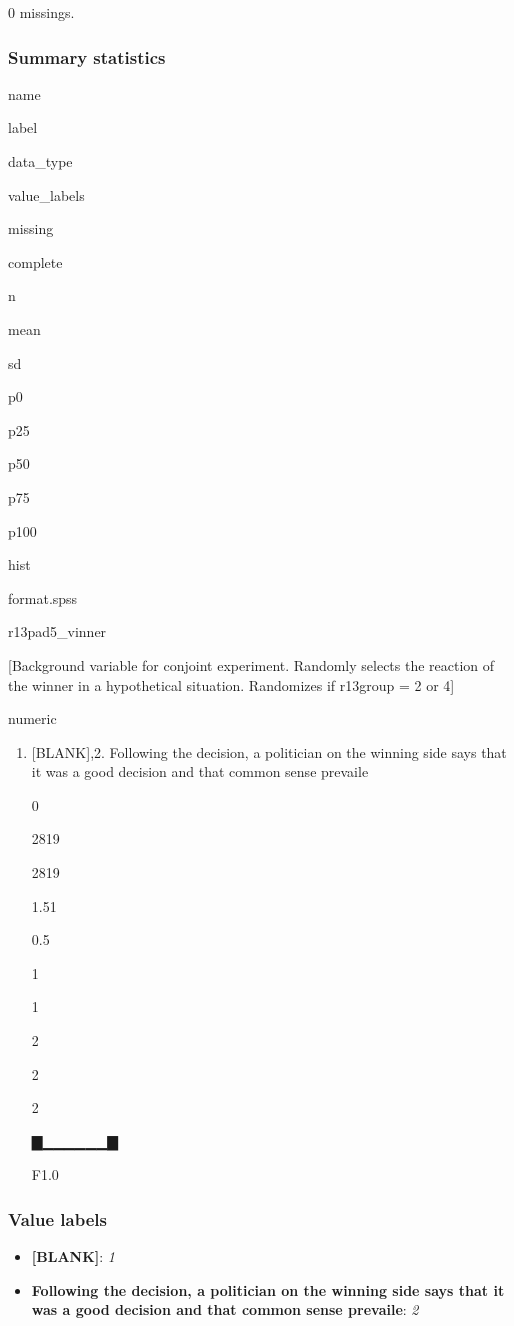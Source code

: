 \documentclass[]{book}
\providecommand{\tightlist}{%
  \setlength{\itemsep}{0pt}\setlength{\parskip}{0pt}}
\begin{document}
0 missings.

\subsubsection{Summary statistics}\label{r13pad5_vinner_summary}

name

label

data\_type

value\_labels

missing

complete

n

mean

sd

p0

p25

p50

p75

p100

hist

format.spss

r13pad5\_vinner

{[}Background variable for conjoint experiment. Randomly selects the
reaction of the winner in a hypothetical situation. Randomizes if
r13group = 2 or 4{]}

numeric

\begin{enumerate}
\def\labelenumi{\arabic{enumi}.}
\tightlist
\item
  {[}BLANK{]},2. Following the decision, a politician on the winning
  side says that it was a good decision and that common sense prevaile

  0

  2819

  2819

  1.51

  0.5

  1

  1

  2

  2

  2

  ▇▁▁▁▁▁▁▇

  F1.0
\end{enumerate}

\subsubsection{Value labels}\label{r13pad5_vinner_labels}

\begin{itemize}
\tightlist
\item
  \textbf{{[}BLANK{]}}: \emph{1}
\item
  \textbf{Following the decision, a politician on the winning side says
  that it was a good decision and that common sense prevaile}: \emph{2}
\end{itemize}
\end{document}
